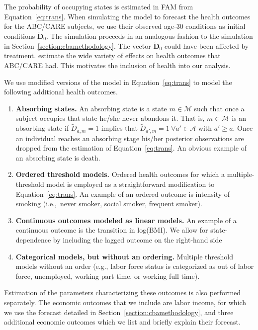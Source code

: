 The probability of occupying states is estimated in FAM from Equation~\eqref{eq:trans}. When simulating the model to forecast the health outcomes for the ABC/CARE subjects, we use their observed age-30 conditions as initial conditions  $\tilde{\bm{D}}_0$. The simulation proceeds in an analogous fashion to the simulation in Section~\ref{section:cbamethodology}. The vector $\tilde{\bm{D}}_0$ could have been affected by treatment. \citet{Campbell_Conti_etal_2014_EarlyChildhoodInvestments} estimate the wide variety of effects on health outcomes that ABC/CARE had. This motivates the inclusion of health into our analysis.

We use modified versions of the model in Equation~\eqref{eq:trans} to model the following additional health outcomes.

\begin{enumerate}
\item \textbf{Absorbing states.} An absorbing state is a state $m \in \mathcal{M}$ such that once a subject occupies that state he/she never abandons it. That is, $m \in \mathcal{M}$ is an absorbing state if $\tilde{D}_{a,m} = 1$ implies that $\tilde{D}_{a',m} = 1 \ \forall a' \in \mathcal{A}$ with $a' \geq a.$ Once an individual reaches an absorbing stage his/her posterior observations are dropped from the estimation of Equation~\eqref{eq:trans}. An obvious example of an absorbing state is death.
\item \textbf{Ordered threshold models.} Ordered health outcomes for which a multiple-threshold model is employed as a straightforward modification to Equation~\eqref{eq:trans}. An example of an ordered outcome is intensity of smoking (i.e.,\ never smoker, social smoker, frequent smoker).
\item \textbf{Continuous outcomes modeled as linear models.} An example of a continuous outcome is the
transition in log(BMI). We allow for state-dependence by including the lagged outcome on the right-hand side
\item \textbf{Categorical models, but without an ordering.} Multiple threshold models without an order (e.g., labor force status is categorized as out of labor force, unemployed, working part time, or working full time).
\end{enumerate}

Estimation of the parameters characterizing these outcomes is also performed separately. The economic outcomes that we include are labor income, for which we use the forecast detailed in Section~\ref{section:cbamethodology}, and three additional economic outcomes which we list and briefly explain their forecast. 

